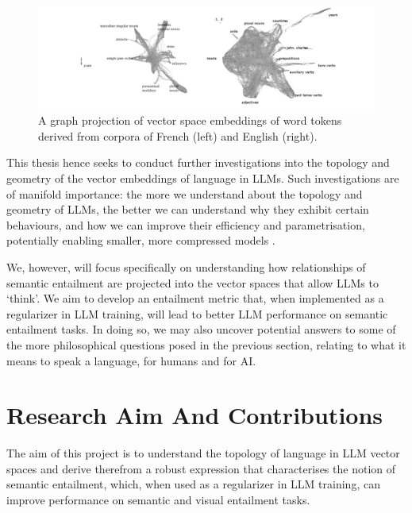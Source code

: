 \documentclass[12pt,twoside]{report}
\begin{document}
\begin{figure}[tb]
\centering
\includegraphics[width = 1\hsize]{./figures/graph_projection_fitz}
\caption{A graph projection of vector space embeddings of word tokens derived from corpora of French (left) and English (right).}
\label{fig:EmbeddingsFrenchEnglish}
\end{figure}

\par
This thesis hence seeks to conduct further investigations into the topology and geometry of the vector embeddings of language in LLMs. Such investigations are of manifold importance: the more we understand about the topology and geometry of LLMs, the better we can understand why they exhibit certain behaviours, and how we can improve their efficiency and parametrisation, potentially enabling smaller, more compressed models \cite{fitz2024hiddenholestopologicalaspects}. \newline \par

We, however, will focus specifically on understanding how relationships of semantic entailment are projected into the vector spaces that allow LLMs to `think'. We aim to develop an entailment metric that, when implemented as a regularizer in LLM training, will lead to better LLM performance on semantic entailment tasks. In doing so, we may also uncover potential answers to some of the more philosophical questions posed in the previous section, relating to what it means to speak a language, for humans and for AI. 

\section{Research Aim And Contributions}

The aim of this project is to understand the topology of language in LLM vector spaces and derive therefrom a robust expression that characterises the notion of semantic entailment, which, when used as a regularizer in LLM training, can improve performance on semantic and visual entailment tasks.  \newline \par
\end{document}

